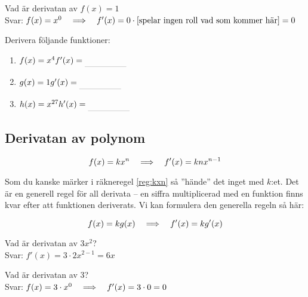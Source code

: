 \documentclass[a4paper, 12pt]{article}
\begin{document}
\begin{exempel}
    Vad är derivatan av $f(x) = 1$\\
    Svar: $f(x) = x^0 \hspace{1em} \Longrightarrow \hspace{1em} f'(x) = 0 \cdot \left [ \text{spelar ingen roll vad som kommer här}\right] = 0$
\end{exempel}

\begin{uppgifter}
    \label{upp:x^n}
    Derivera följande funktioner:
    \begin{multicols}{3}
        \begin{enumerate}
            \item $f(x) = x^4 \\ f'(x) \ans$
            \item $g(x) = 1 \\ g'(x) \ans$
            \item $h(x) = x^{27} \\ h'(x) \ans$
        \end{enumerate}
    \end{multicols}
\end{uppgifter}

\subsection{Derivatan av polynom}

\begin{regel}
    \label{reg:kxn}
    \[f(x) = kx^n \hspace{1em} \Longrightarrow \hspace{1em} f'(x) = knx^{n-1}\]
\end{regel}
Som du kanske märker i räkneregel \ref*{reg:kxn} så ''hände'' det inget med $k$:et. Det är en generell regel för all derivata -- en siffra multiplicerad med en funktion finns kvar efter att funktionen deriverats. Vi kan formulera den generella regeln så här:

\begin{regel}
    \label{reg:kf(x)}
    \[ f(x) = k g(x) \hspace{1em} \Longrightarrow \hspace{1em} f'(x) = k g'(x) \]
\end{regel}

\begin{exempel}
    Vad är derivatan av $3x^2$? \\ Svar: $f'(x) = 3\cdot 2x^{2-1} = 6x$
\end{exempel}

\begin{exempel}
    Vad är derivatan av $3$? \\ Svar: $f(x) = 3 \cdot x^0 \hspace{1em} \Longrightarrow \hspace{1em} f'(x) = 3 \cdot 0 = 0$
\end{exempel}
\end{document}
